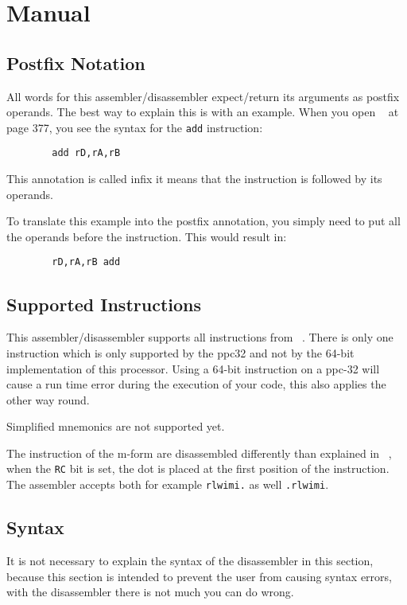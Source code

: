 \section{Manual}
\subsection{Postfix Notation}
    All words for this assembler/disassembler expect/return its arguments 
    as postfix operands. The best way to explain this is with an example.  
    When you open ~\cite{ppcman} at page 377, you see the syntax for the
    \texttt{add} instruction:
    
    \begin{verbatim}
        add rD,rA,rB
    \end{verbatim}
    This annotation is called infix it means that the instruction is
    followed by its operands.

    To translate this example into the postfix annotation, you simply
    need to put all the operands before the instruction. This would
    result in:

    \begin{verbatim}
        rD,rA,rB add
    \end{verbatim}
\subsection{Supported Instructions}
    This assembler/disassembler supports all instructions from ~\cite{ppcman}. 
    There is only one instruction which is only supported by the ppc32 and not 
    by the 64-bit implementation of this processor. Using a 64-bit instruction 
    on a ppc-32 will cause a run time error during the execution of your code,
    this also applies the other way round.

    Simplified mnemonics are not supported yet.

    The instruction of the m-form are disassembled differently than
    explained in ~\cite{ppcman}, when the \texttt{RC} bit is set, the dot is 
    placed at the first position of the instruction. The assembler accepts 
    both for example \texttt{rlwimi.} as well \texttt{.rlwimi}.

\subsection{Syntax}
    It is not necessary to explain the syntax of the disassembler in this
    section, because this section is intended to prevent the user from
    causing syntax errors, with the disassembler there is not much you can
    do wrong.

